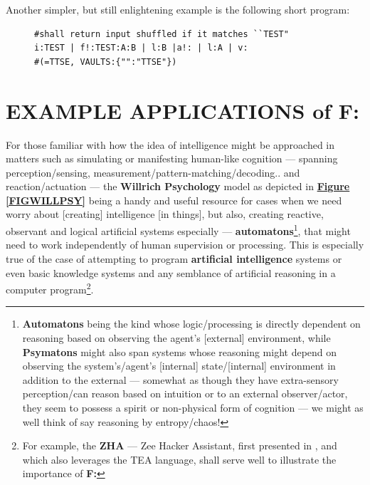 \documentclass[a4paper, 18pt]{book} %
\begin{document}
\vspace{1em}


Another simpler, but still enlightening example is the following short program:


\begin{figure}[H]
 \Large
  \centering
  \begin{tcolorbox}[teaterminalstyle, title=F: EXAMPLE 2]
  \begin{lstlisting}[language=TEA]
#shall return input shuffled if it matches ``TEST" 
i:TEST | f!:TEST:A:B | l:B |a!: | l:A | v: 
#(=TTSE, VAULTS:{"":"TTSE"})
   \end{lstlisting}
  \end{tcolorbox}
\end{figure}


\section{EXAMPLE APPLICATIONS of F:}
\label{SECEXAMPF}

  
For those familiar with how the idea of intelligence might be approached in matters such as simulating or manifesting human-like cognition --- spanning perception/sensing, measurement/pattern-matching/decoding.. and reaction/actuation --- the \textbf{Willrich Psychology} model\cite{Lutalo2025transpsy} as depicted in \textbf{\hyperref[FIGWILLPSY]{Figure \ref{FIGWILLPSY}}} being a handy and useful resource for cases when we need worry about [creating] intelligence [in things], but also, creating reactive, observant and logical artificial systems especially --- \textbf{automatons}\footnote{\textbf{Automatons} being the kind whose logic/processing is directly dependent on reasoning based on observing the agent's [external] environment, while \textbf{Psymatons}\cite{lutalo2025unraveling} might also span systems whose reasoning might depend on observing the system's/agent's [internal] state/[internal] environment in addition to the external --- somewhat as though they have extra-sensory perception/can reason based on intuition or to an external observer/actor, they seem to possess a spirit or non-physical form of cognition --- we might as well think of say reasoning by entropy/chaos!}, that might need to work independently of human supervision or processing. This is especially true of the case of attempting to program \textbf{artificial intelligence} systems or even basic knowledge systems and any semblance of artificial reasoning in a computer program\footnote{For example, the \textbf{ZHA} --- Zee Hacker Assistant, first presented in \cite{jwlzha}, and which also leverages the TEA language, shall serve well to illustrate the importance of \textbf{F:}}.
\end{document}
